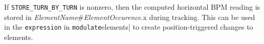 If \verb|STORE_TURN_BY_TURN| is nonzero, then the computed horizontal BPM reading is stored in
{\em ElementName}\#{\em ElementOccurence}.x during tracking.
This can be used in the \verb|expression| in \verb|modulate|elements| to create position-triggered
changes to elements.
